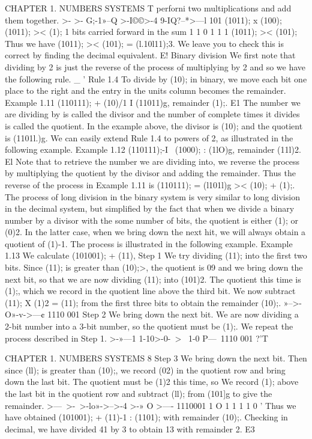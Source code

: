 CHAPTER 1. NUMBERS SYSTEMS T
perforni two multiplications and add them together.
>- >-
G;-1»--Q
>-I©©>-4
9-IQ?--*>—l
101
(1011); x (100);
(1011); >< (1);
1 bits carried forward in the sum
1 1 0 1 1 1 (1011); >< (101);
Thus we have (1011); >< (101); = (l.10l11);3. We leave you to check this is correct by ﬁnding the
decimal equivalent. E!
Binary division
We ﬁrst note that dividing by 2 is just the reverse of the process of multiplying by 2 and so we
have the following rule. _ '
Rule 1.4 To divide by (10); in binary, we move each bit one place to the right and the entry in
the units column becomes the remainder.
Example 1.11 (110111); + (10)/1 I (11011)g, remainder (1);. E1
The number we are dividing by is called the divisor and the number of complete times it divides
is called the quotient. In the example above, the divisor is (10); and the quotient is (1101l.)g.
We can easily extend Rule 1.4 to powers of 2, as illustrated in the following example.
Example 1.12 (110111);-I~ (1000); : (1lO)g, remainder (11l)2. El
Note that to retrieve the number we are dividing into, we reverse the process by multiplying the
quotient by the divisor and adding the remainder. Thus the reverse of the process in Example 1.11
is
(110111); = (l101l)g >< (10); + (1);.
The process of long division in the binary system is very similar to long division in the decimal
system, but simpliﬁed by the fact that when we divide a binary number by a divisor with the some
number of bits, the quotient is either (1); or (0)2. In the latter case, when we bring down the next
hit, we will always obtain a quotient of (1)-1. The process is illustrated in the following example.
Example 1.13 We calculate (101001); + (11),
Step 1 We try dividing (11); into the ﬁrst two bits. Since (11); is greater than (10);>, the quotient
is 09 and we bring down the next bit, so that we are now dividing (11); into (101)2. The
quotient this time is (1);, which we record in the quotient line above the third bit. We now
subtract (11); X (1)2 = (11); from the ﬁrst three bits to obtain the remainder (10);.
»-->-
O»-v->—¢
1110 001
Step 2 We bring down the next bit. We are now dividing a 2-bit number into a 3-bit number, so
the quotient must be (1);. We repeat the process described in Step 1.
>-»—1
1-10>-0-~>~
1-0 P—\
1110 001
?'T

CHAPTER 1. NUMBERS SYSTEMS 8
Step 3 We bring down the next bit. Then since (ll); is greater than (10);, we record (02) in
the quotient row and bring down the last bit. The quotient must be (1)2 this time, so We
record (1); above the last bit in the quotient row and subtract (ll); from (101]g to give the
remainder.
>—~>-\
>-lo»->-->-4
 >-»
O
>—-
1110001
1 O 1
1 1
1 0 '
Thus we have obtained (101001); + (11)-1 : (1101); with remainder (10);. Checking in decimal,
we have divided 41 by 3 to obtain 13 with remainder 2. E3

